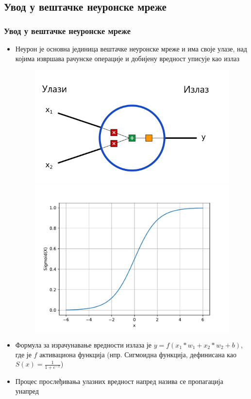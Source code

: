 \subsection{Увод у вештачке неуронске мреже}
\begin{frame}
\frametitle{Увод у вештачке неуронске мреже}
\begin{itemize}
 \item \alert{Неурон} је основна јединица вештачке неуронске мреже и има своје улазе,
над којима извршава рачунске операције и добијену вредност уписује
као излаз
\begin{figure}[H]
  \centering
      \includegraphics[scale=0.26]{slike/neuron.png} \hspace{1.2cm}      
      \includegraphics[scale=0.26]{slike/sigmoid}
 \end{figure}
 \item Формула за израчунавање вредности излаза
 је $y = f(x_1 * w_1 + x_2 * w_2 + b)$, где је $f$ \alert{активациона
 функција} (нпр. Сигмоидна функција, дефинисана као
 $S(x) = \frac{1}{1+e^{-x}}$)
 \item Процес прослеђивања улазних вредност напред назива се \alert{пропагација унапред}
\end{itemize}
\end{frame}

